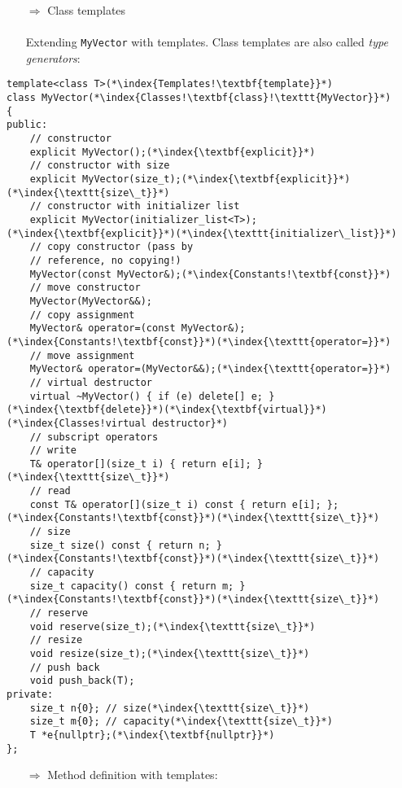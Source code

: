 \documentclass[10pt]{book}
\begin{document}
\begin{enumerate}
\item[$\Rightarrow$] Class templates\\ \\ Extending \texttt{MyVector} with templates. Class templates are also called \emph{type generators}:
\end{enumerate}
\begin{lstlisting}
template<class T>(*\index{Templates!\textbf{template}}*)
class MyVector(*\index{Classes!\textbf{class}!\texttt{MyVector}}*)
{
public:
    // constructor
    explicit MyVector();(*\index{\textbf{explicit}}*)
    // constructor with size
    explicit MyVector(size_t);(*\index{\textbf{explicit}}*)(*\index{\texttt{size\_t}}*)
    // constructor with initializer list
    explicit MyVector(initializer_list<T>);(*\index{\textbf{explicit}}*)(*\index{\texttt{initializer\_list}}*)
    // copy constructor (pass by
    // reference, no copying!)
    MyVector(const MyVector&);(*\index{Constants!\textbf{const}}*)
    // move constructor
    MyVector(MyVector&&);
    // copy assignment
    MyVector& operator=(const MyVector&);(*\index{Constants!\textbf{const}}*)(*\index{\texttt{operator=}}*)
    // move assignment
    MyVector& operator=(MyVector&&);(*\index{\texttt{operator=}}*)
    // virtual destructor
    virtual ~MyVector() { if (e) delete[] e; }(*\index{\textbf{delete}}*)(*\index{\textbf{virtual}}*)(*\index{Classes!virtual destructor}*)
    // subscript operators
    // write
    T& operator[](size_t i) { return e[i]; }(*\index{\texttt{size\_t}}*)
    // read
    const T& operator[](size_t i) const { return e[i]; };(*\index{Constants!\textbf{const}}*)(*\index{\texttt{size\_t}}*)
    // size
    size_t size() const { return n; }(*\index{Constants!\textbf{const}}*)(*\index{\texttt{size\_t}}*)
    // capacity
    size_t capacity() const { return m; }(*\index{Constants!\textbf{const}}*)(*\index{\texttt{size\_t}}*)
    // reserve
    void reserve(size_t);(*\index{\texttt{size\_t}}*)
    // resize
    void resize(size_t);(*\index{\texttt{size\_t}}*)
    // push back
    void push_back(T);
private:
    size_t n{0}; // size(*\index{\texttt{size\_t}}*)
    size_t m{0}; // capacity(*\index{\texttt{size\_t}}*)
    T *e{nullptr};(*\index{\textbf{nullptr}}*)
};
\end{lstlisting}
\begin{enumerate}
\item[$\Rightarrow$] Method definition with templates:
\end{enumerate}
\end{document}
